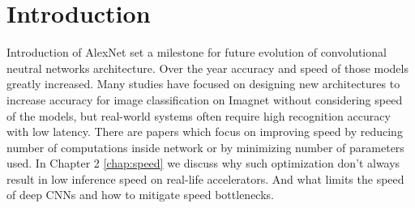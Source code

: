 

\chapter{Introduction}







Introduction of AlexNet \cite{krizhevsky2012_imagenet_alexnet} set a milestone for future evolution of convolutional neutral networks architecture. Over the year accuracy and speed of those models greatly increased. Many studies have focused on designing new architectures to increase accuracy for image classification on Imagnet without considering speed of the models, but real-world systems often require high recognition accuracy with low latency. There are papers which focus on improving speed by reducing number of computations inside network or by minimizing number of parameters used. In Chapter 2 \ref{chap:speed} we discuss why such optimization don't always result in low inference speed on real-life accelerators. And what limits the speed of deep CNNs and how to mitigate speed bottlenecks.

